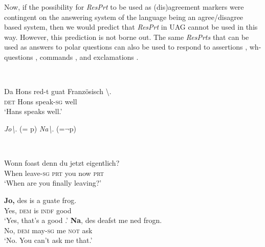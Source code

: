 \documentclass[output=paper]{LSP/langsci}
\begin{document}
Now, if the possibility for \textit{ResPrt} to be used as (dis)agreement markers were contingent on the answering system of the language being an agree/disagree based system, then we would predict that \textit{ResPrt} in UAG cannot be used in this way. However, this prediction is not borne out. The same \textit{ResPrts} that can be used as answers to polar questions can also be used to respond to assertions , wh-questions , commands , and exclamations . 


\ea\label{ex:wiltschko:49}\settowidth{}
\\
\begin{xlist}
      \gll Da  Hons  red-t           guat  Französisch {\textbackslash}.\\
      \textsc{det} Hons speak-\textsc{sg}  well  \\
      \glt ‘Hans speaks  well.’
\begin{xlisti}
    \ex \textit{Jo{\textbackslash}}. (= p)    
    \ex \textit{Na{\textbackslash}}.  (=$¬$p) 
\end{xlisti}
\end{xlist}
\z


\ea\label{ex:wiltschko:50}\settowidth{}
\\
\begin{xlist}
\gll Wonn foast         denn du jetzt eigentlich?   \\
When leave-\textsc{sg} \textsc{prt} you now \textsc{prt}\\
\glt ‘When are you finally leaving?’
\begin{xlisti}
    \ex 
	\gll  \textbf{{Jo,}}   des   is a         guate   frog.\\
	Yes, \textsc{dem} is \textsc{indf} good   \\
	\glt ‘Yes, that’s a good .’ 
   \ex
	  \gll \textbf{Na}, des  deafst      me ned frogn.\\
	  No, \textsc{dem} may-\textsc{sg} me \textsc{not} ask\\
	  \glt ‘No. You can’t ask me that.’
\end{xlisti}
\end{xlist}
\z
\end{document}
